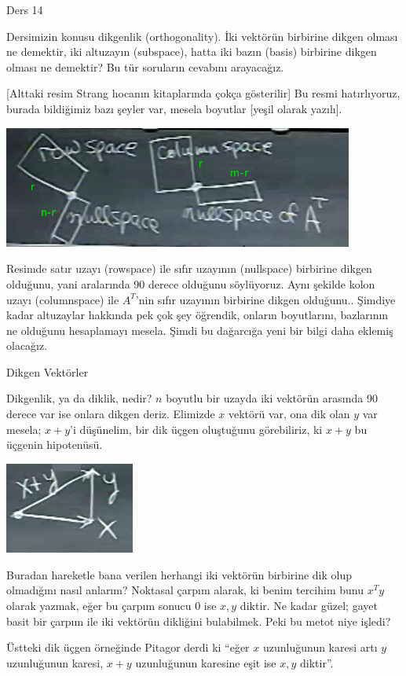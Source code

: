 \documentclass[12pt,fleqn]{article}\usepackage{../../common}
\begin{document}
Ders 14

Dersimizin konusu dikgenlik (orthogonality). İki vektörün birbirine dikgen
olması ne demektir, iki altuzayın (subspace), hatta iki bazın (basis)
birbirine dikgen olması ne demektir? Bu tür soruların cevabını arayacağız.

[Alttaki resim Strang hocanın kitaplarında çokça gösterilir] Bu resmi
hatırlıyoruz, burada bildiğimiz bazı şeyler var, mesela boyutlar [yeşil olarak
  yazılı].

\includegraphics[height=4cm]{14_1.png}

Resimde satır uzayı (rowspace) ile sıfır uzayının (nullspace) birbirine dikgen
olduğunu, yani aralarında 90 derece olduğunu söylüyoruz. Aynı şekilde kolon
uzayı (columnspace) ile $A^T$'nin sıfır uzayının birbirine dikgen
olduğunu.. Şimdiye kadar altuzaylar hakkında pek çok şey öğrendik, onların
boyutlarını, bazlarının ne olduğunu hesaplamayı mesela. Şimdi bu dağarcığa yeni
bir bilgi daha eklemiş olacağız.

Dikgen Vektörler

Dikgenlik, ya da diklik, nedir? $n$ boyutlu bir uzayda iki vektörün arasında 90
derece var ise onlara dikgen deriz. Elimizde $x$ vektörü var, ona dik olan $y$
var mesela; $x+y$'i düşünelim, bir dik üçgen oluştuğunu görebiliriz, ki $x+y$ bu
üçgenin hipotenüsü.

\includegraphics[height=3cm]{14_2.png}

Buradan hareketle bana verilen herhangi iki vektörün birbirine dik olup
olmadığını nasıl anlarım? Noktasal çarpım alarak, ki benim tercihim bunu $x^Ty$
olarak yazmak, eğer bu çarpım sonucu 0 ise $x,y$ diktir. Ne kadar güzel; gayet
basit bir çarpım ile iki vektörün dikliğini bulabilmek. Peki bu metot niye
işledi?

Üstteki dik üçgen örneğinde Pitagor derdi ki ``eğer $x$ uzunluğunun karesi artı
$y$ uzunluğunun karesi, $x+y$ uzunluğunun karesine eşit ise $x,y$ diktir''.
\end{document}
